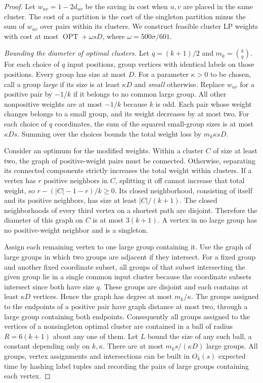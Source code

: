 \documentclass[11pt]{article}
\begin{document}
\begin{proof}
Let $w_{uv}=1-2d_{uv}$ be the saving in cost when $u,v$ are placed
in the same cluster. The cost of a partition is the cost of the
singleton partition minus the sum of $w_{uv}$ over pairs within its
clusters. We construct feasible cluster LP
weights with cost at most $\operatorname{OPT}+\omega sD$, where
$\omega=500\sigma/601$.

\emph{Bounding the diameter of optimal clusters.}
Let $q=(k+1)/2$ and $m_k=\binom{k}{q}$. For each choice of $q$
input positions, group vertices with identical labels on those
positions. Every group has size at most $D$. For a
parameter $\kappa>0$ to be chosen, call a group \emph{large} if its size
is at least $\kappa D$ and \emph{small} otherwise. Replace $w_{uv}$ for a
positive pair by $-1/k$ if it belongs to no common large group.
All other nonpositive weights are at most $-1/k$ because $k$ is odd.
Each pair whose weight changes belongs to a small group, and its
weight decreases by at most two. For each choice of $q$ coordinates, the sum of the squared
small-group sizes is at most $\kappa Ds$. Summing over the choices
bounds the total weight loss by $m_k\kappa sD$.

Consider an optimum for the modified weights. Within a cluster
$C$ of size at least two, the graph of positive-weight pairs must
be connected. Otherwise, separating its connected components
strictly increases the total weight within clusters. If a vertex has $r$ positive neighbors
in $C$, splitting it off cannot increase that total weight, so
$r-(|C|-1-r)/k\ge0$. Its closed neighborhood, consisting of itself
and its positive neighbors, has size at least $|C|/(k+1)$.
The closed neighborhoods of every third vertex on a shortest
path are disjoint. Therefore the diameter of this graph on $C$
is at most $3(k+1)$. A vertex in no large group has no positive-weight
neighbor and is a singleton.

Assign each remaining vertex to one large group containing it. Use the graph of large
groups in which two groups are
adjacent if they intersect. For a fixed group and another fixed
coordinate subset, all groups of that subset intersecting the given
group lie in a single common input cluster because the coordinate subsets
intersect since both have size $q$. These groups are disjoint and
each contains at least $\kappa D$ vertices. Hence the graph has degree
at most $m_k/\kappa$. The groups assigned to the endpoints of a positive pair have graph
distance at most two, through a large group containing both endpoints. Consequently all
groups assigned to the vertices of a
nonsingleton optimal cluster are contained in a ball of radius
$R=6(k+1)$ about any one of them. Let $L$ bound the size of any such
ball, a constant depending only on $k,\kappa$. There are at most
$m_k s/(\kappa D)$ large groups. All groups, vertex assignments and
intersections can be built in $O_k(s)$ expected time by hashing label
tuples and recording the pairs of large groups containing each vertex.


\end{proof}
\end{document}
